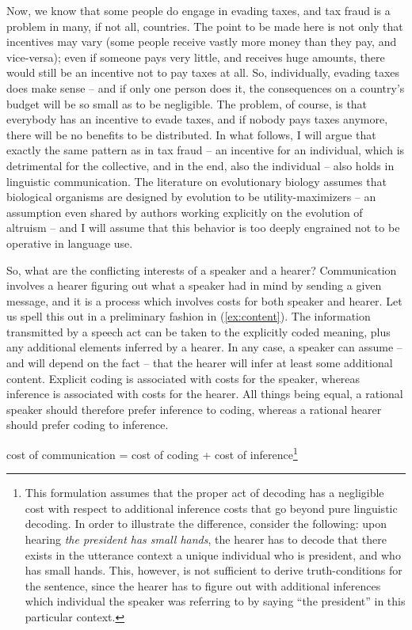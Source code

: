 \documentclass[output=paper,hidelinks]{langscibook}
\begin{document}
Now, we know that some people do engage in evading taxes, and tax fraud is a problem in many, if not all, countries. The point to be made here is not only that incentives may vary (some people receive vastly more money than they pay, and vice-versa); even if someone pays very little, and receives huge amounts, there would still be an incentive not to pay taxes at all. So, individually, evading taxes does make sense -- and if only one person does it, the consequences on a country's budget will be so small as to be negligible. The problem, of course, is that everybody has an incentive to evade taxes, and if nobody pays taxes anymore, there will be no benefits to be distributed. In what follows, I will argue that exactly the same pattern as in tax fraud -- an incentive for an individual, which is detrimental for the collective, and in the end, also the individual -- also holds in linguistic communication. The literature on evolutionary biology assumes that biological organisms are designed by evolution to be utility-maximizers -- an assumption even shared by authors working explicitly on the evolution of altruism \citep[see, e.g.,][]{bourke11} --  and I will assume that this behavior is too deeply engrained not to be operative in language use.

So, what are the conflicting interests of a speaker and a hearer? Communication involves a hearer figuring out what a speaker had in mind by sending a given message, and it is a process which involves costs for both speaker and hearer. Let us spell this out in a preliminary fashion in (\ref{ex:content}). The information transmitted by a speech act can be taken to the explicitly coded meaning, plus any additional elements inferred by a hearer. In any case, a speaker can assume -- and will depend on the fact -- that the hearer will infer at least some additional content. Explicit coding is associated with costs for the speaker, whereas inference is associated with costs for the hearer. All things being equal, a rational speaker should therefore prefer inference to coding, whereas a rational hearer should prefer coding to inference.%

\ea \label{ex:content}
cost of communication = cost of coding + cost of inference\footnote{This formulation assumes that the proper act of decoding has a negligible cost with respect to additional inference costs that go beyond pure linguistic decoding. In order to illustrate the difference, consider the following: upon hearing \emph{the president has small hands}, the hearer has to decode that there exists in the utterance context a unique individual who is president, and who has small hands. This, however, is not sufficient to derive truth-conditions for the sentence, since the hearer has to figure out with additional inferences which individual the speaker was referring to by saying ``the president'' in this particular context.}
\z
\end{document}
